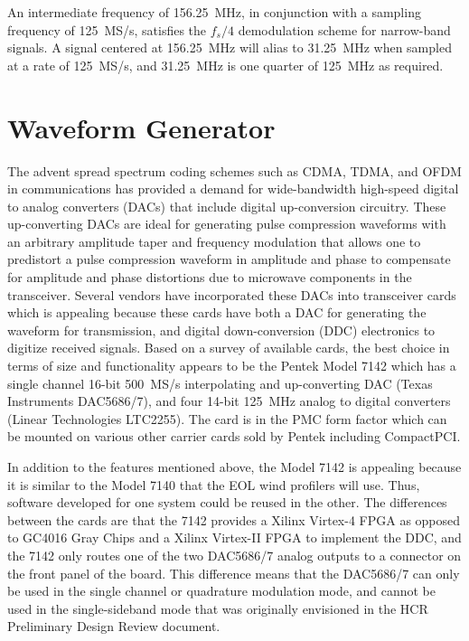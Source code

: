 \documentclass[12pt,letterpaper]{article}
\begin{document}
An intermediate frequency of 156.25~MHz, in conjunction with a
sampling frequency of 125~MS/s, satisfies the $f_s/4$ demodulation
scheme for narrow-band signals. A signal centered at 156.25~MHz will
alias to 31.25~MHz when sampled at a rate of 125~MS/s, and 31.25~MHz
is one quarter of 125~MHz as required.

\section{Waveform Generator}
\label{sec:waveform_generator}

The advent spread spectrum coding schemes such as CDMA, TDMA, and OFDM
in communications has provided a demand for wide-bandwidth high-speed
digital to analog converters (DACs) that include digital up-conversion
circuitry. These up-converting DACs are ideal for generating pulse
compression waveforms with an arbitrary amplitude taper and frequency
modulation that allows one to predistort a pulse compression waveform
in amplitude and phase to compensate for amplitude and phase
distortions due to microwave components in the transceiver. Several
vendors have incorporated these DACs into transceiver cards which is
appealing because these cards have both a DAC for generating the
waveform for transmission, and digital down-conversion (DDC)
electronics to digitize received signals. Based on a survey of
available cards, the best choice in terms of size and functionality
appears to be the Pentek Model 7142 which has a single channel 16-bit
500~MS/s interpolating and up-converting DAC (Texas Instruments
DAC5686/7), and four 14-bit 125~MHz analog to digital converters
(Linear Technologies LTC2255). The card is in the PMC form factor
which can be mounted on various other carrier cards sold by Pentek
including CompactPCI.

In addition to the features mentioned above, the Model 7142 is
appealing because it is similar to the Model 7140 that the EOL wind
profilers will use. Thus, software developed for one system could be
reused in the other. The differences between the cards are that the
7142 provides a Xilinx Virtex-4 FPGA as opposed to GC4016 Gray Chips
and a Xilinx Virtex-II FPGA to implement the DDC, and the 7142 only
routes one of the two DAC5686/7 analog outputs to a connector on the
front panel of the board. This difference means that the DAC5686/7 can
only be used in the single channel or quadrature modulation mode, and
cannot be used in the single-sideband mode that was originally
envisioned in the HCR Preliminary Design Review document.
\end{document}
